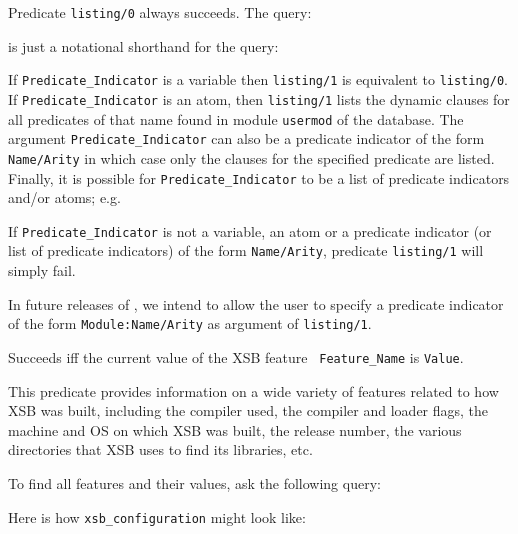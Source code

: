 \begin{description}
    Predicate {\tt listing/0} always succeeds.  The query:


    \noindent
    is just a notational shorthand for the query:


    If {\tt Predicate\_Indicator} is a variable then {\tt listing/1} is
    equivalent to {\tt listing/0}.
    If {\tt Predicate\_Indicator} is an atom, then {\tt listing/1} 
    lists the dynamic clauses for all predicates of that name found in 
    module {\tt usermod} of the database.
    The argument {\tt Predicate\_Indicator} can also be a predicate 
    indicator of the form {\tt Name/Arity} in which case only the 
    clauses for the specified predicate are listed.
    Finally, it is possible for {\tt Predicate\_Indicator}
    to be a list of predicate indicators and/or atoms; e.g.


    If {\tt Predicate\_Indicator} is not a variable, an atom or a predicate 
    indicator (or list of predicate indicators) of the form {\tt Name/Arity}, 
    predicate {\tt listing/1} will simply fail.

    In future releases of \ourprolog, we intend to allow the user to
    specify a predicate indicator of the form {\tt Module:Name/Arity} 
    as argument of {\tt listing/1}.

    Succeeds iff the current value of the XSB  feature {\tt
    Feature\_Name} is {\tt Value}.

    This predicate provides information on a wide variety of features
    related to how XSB was built, including the compiler used, the compiler
    and loader flags, the machine and OS on which XSB was built, the
    release number, the various directories that XSB uses to find its
    libraries, etc.

    To find all features and their values, ask the following query:


    Here is how {\tt xsb\_configuration} might look like:


\end{description}
